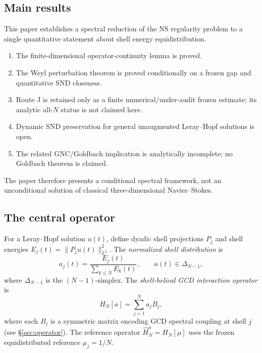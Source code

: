 \documentclass[12pt]{amsart}
\theoremstyle{definition}
\newcommand{\HN}{\widehat{H}_N^\mu}
\begin{document}
\subsection{Main results}

This paper establishes a spectral reduction of the NS regularity
problem to a single quantitative statement about shell energy
equidistribution.

\begin{tcolorbox}[statusbox,
  title=\textbf{Current logical status}]
\begin{enumerate}
\item The finite-dimensional operator-continuity lemma is proved.
\item The Weyl perturbation theorem is proved conditionally on a frozen
      gap and quantitative SND closeness.
\item Route J is retained only as a finite numerical/under-audit frozen
      estimate; its analytic all-$N$ status is not claimed here.
\item Dynamic SND preservation for general unaugmented Leray--Hopf
      solutions is open.
\item The related GNC/Goldbach implication is analytically incomplete;
      no Goldbach theorem is claimed.
\end{enumerate}
The paper therefore presents a conditional spectral framework, not an
unconditional solution of classical three-dimensional Navier--Stokes.
\end{tcolorbox}

\subsection{The central operator}

For a Leray--Hopf solution $u(t)$, define dyadic shell projections
$P_j$ and shell energies $E_j(t)=\|P_j u(t)\|_{L^2}^2$.
The \emph{normalized shell distribution} is
\begin{equation}
\label{eq:normalize}
a_j(t) = \frac{E_j(t)}{\displaystyle\sum_{k\le N}E_k(t)},
\qquad a(t)\in\Delta_{N-1},
\end{equation}
where $\Delta_{N-1}$ is the $(N-1)$-simplex.
The \emph{shell-helical GCD interaction operator} is
\begin{equation}
\label{eq:HN}
H_N[a] = \sum_{j=1}^N a_j B_j,
\end{equation}
where each $B_j$ is a symmetric matrix encoding GCD spectral coupling
at shell $j$ (see \S\ref{sec:operator}).
The reference operator $\HN = H_N[\mu]$ uses the frozen equidistributed
reference $\mu_j = 1/N$.
\end{document}
